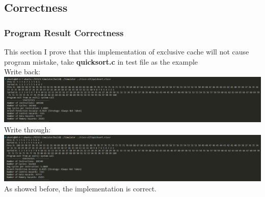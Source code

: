\documentclass{article}
\begin{document}
\subsection{Correctness}
\subsubsection{Program Result Correctness}
This section I prove that this implementation of exclusive cache will not cause program mistake, take \textbf{quicksort.c} in test file as the example\\
Write back:\\
\includegraphics[scale = 0.25]{Correctness of write back.png}\\
Write through:\\
\includegraphics[scale = 0.25]{Write Through correntess.png}\\
As showed before, the implementation is correct.
\end{document}
